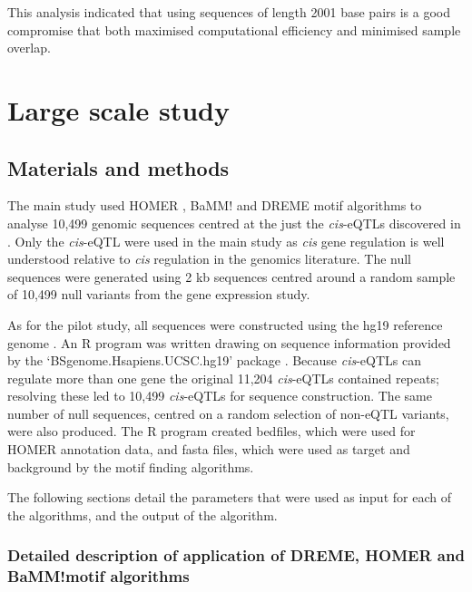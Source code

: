 \documentclass[12pt]{article}
\begin{document}
This analysis indicated that using sequences of length 2001 base pairs is a good compromise that both maximised computational efficiency and minimised sample overlap.
 

\section{Large scale study} 
\subsection{Materials and methods}

The main study used HOMER  \citep{heinz2010simple}, BaMM! \citep{siebert2016bayesian} and DREME \citep{bailey2011dreme} motif algorithms to analyse 10,499 genomic sequences centred at the just the \emph{cis}-eQTLs discovered in \citet{lloyd2017genetic}. Only the \emph{cis}-eQTL were used in the main study as  \emph{cis} gene regulation is well understood relative to  \emph{cis} regulation in the genomics literature. The null sequences were generated using 2 kb sequences centred around a random sample of 10,499 null variants from the \citet{lloyd2017genetic} gene expression study. 

As for the pilot study, all sequences were constructed using the hg19 reference genome \citep{Lander2001}. An R program was written drawing on sequence information provided by the `BSgenome.Hsapiens.UCSC.hg19' package \citep{TeamTBD2014}. Because \emph{cis}-eQTLs can regulate more than one gene the original 11,204 \emph{cis}-eQTLs contained repeats; resolving these led to 10,499 \emph{cis}-eQTLs for sequence construction. The same number of null sequences, centred on a random selection of non-eQTL variants, were also produced. The R program created bedfiles, which were used for HOMER annotation data, and fasta files, which were used as target and background by the motif finding algorithms.

The following sections detail the parameters that were used as input for each of the algorithms, and the output of the algorithm.

\subsubsection{Detailed description of application of DREME, HOMER and  BaMM!motif algorithms}
\end{document}
